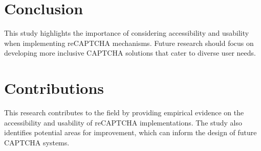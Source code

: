 \documentclass{article}
\begin{document}
\section{Conclusion}
This study highlights the importance of considering accessibility and usability when implementing reCAPTCHA mechanisms. Future research should focus on developing more inclusive CAPTCHA solutions that cater to diverse user needs.

\section{Contributions}
This research contributes to the field by providing empirical evidence on the accessibility and usability of reCAPTCHA implementations. The study also identifies potential areas for improvement, which can inform the design of future CAPTCHA systems.



\end{document}

